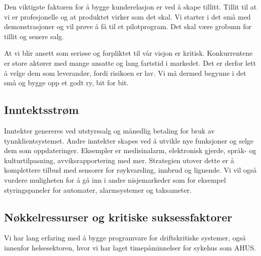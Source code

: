 Den viktigste faktoren for å bygge kunderelasjon er ved å skape tillitt. Tillit
til at vi er profesjonelle og at produktet virker som det skal. Vi starter i
det små med demonstrasjoner og vil prøve å få til et pilotprogram. Det skal
være grobunn for tillit og senere salg.

At vi blir ansett som seriøse og forpliktet til vår visjon er kritisk.
Konkurrentene er store aktører med mange ansatte og lang fartstid i markedet.
Det er derfor lett å velge dem som leverandør, fordi risikoen er lav.
Vi må dermed begynne i det små og bygge opp et godt ry, bit for bit.

\subsection{Inntektsstrøm}


Inntekter genereres ved utstyrssalg og månedlig betaling for bruk av
tynnklientsystemet. Andre inntekter skapes ved å utvikle nye funksjoner og
selge dem som oppdateringer. Eksempler er medisinalarm, elektronisk gjerde,
språk- og kulturtilpasning, avviksrapportering med mer. Strategien utover dette
er å komplettere tilbud med sensorer for røykvarsling, innbrud og lignende. Vi
vil også vurdere muligheten for å gå inn i andre nisjemarkeder som for eksempel
styringspaneler for automater, alarmsystemer og taksameter.

\subsection{Nøkkelressurser og kritiske suksessfaktorer}




Vi har lang erfaring med å bygge programvare for driftskritiske systemer, også
innenfor helsesektoren, hvor vi har laget timepåminnelser for sykehus som AHUS.

